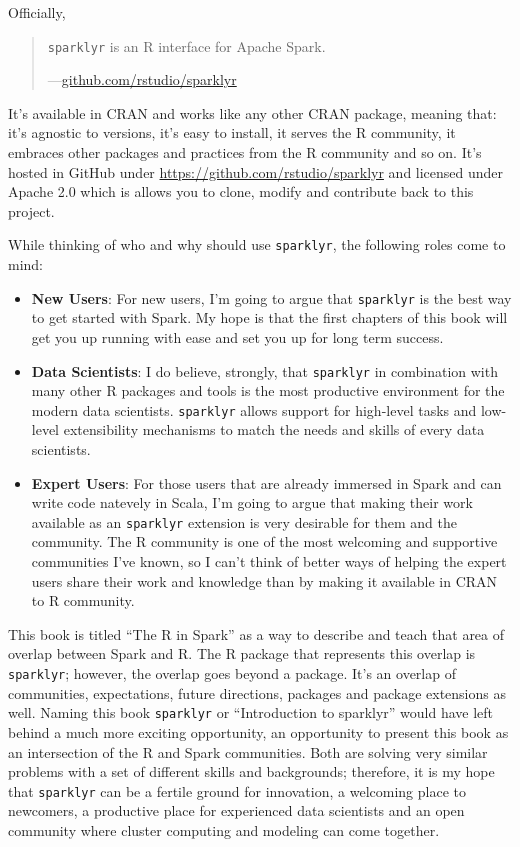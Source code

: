 \documentclass[]{book}
\providecommand{\tightlist}{%
  \setlength{\itemsep}{0pt}\setlength{\parskip}{0pt}}
\theoremstyle{definition}
\theoremstyle{definition}
\theoremstyle{definition}
\theoremstyle{remark}
\begin{document}
Officially,

\begin{quote}
\texttt{sparklyr} is an R interface for Apache Spark.

---\href{https://github.com/rstudio/sparklyr}{github.com/rstudio/sparklyr}
\end{quote}

It's available in CRAN and works like any other CRAN package, meaning
that: it's agnostic to versions, it's easy to install, it serves the R
community, it embraces other packages and practices from the R community
and so on. It's hosted in GitHub under
\href{github.com/rstudio/sparklyr}{https://github.com/rstudio/sparklyr}
and licensed under Apache 2.0 which is allows you to clone, modify and
contribute back to this project.

While thinking of who and why should use \texttt{sparklyr}, the
following roles come to mind:

\begin{itemize}
\tightlist
\item
  \textbf{New Users}: For new users, I'm going to argue that
  \texttt{sparklyr} is the best way to get started with Spark. My hope
  is that the first chapters of this book will get you up running with
  ease and set you up for long term success.
\item
  \textbf{Data Scientists}: I do believe, strongly, that
  \texttt{sparklyr} in combination with many other R packages and tools
  is the most productive environment for the modern data scientists.
  \texttt{sparklyr} allows support for high-level tasks and low-level
  extensibility mechanisms to match the needs and skills of every data
  scientists.
\item
  \textbf{Expert Users}: For those users that are already immersed in
  Spark and can write code natevely in Scala, I'm going to argue that
  making their work available as an \texttt{sparklyr} extension is very
  desirable for them and the community. The R community is one of the
  most welcoming and supportive communities I've known, so I can't think
  of better ways of helping the expert users share their work and
  knowledge than by making it available in CRAN to R community.
\end{itemize}

This book is titled ``The R in Spark'' as a way to describe and teach
that area of overlap between Spark and R. The R package that represents
this overlap is \texttt{sparklyr}; however, the overlap goes beyond a
package. It's an overlap of communities, expectations, future
directions, packages and package extensions as well. Naming this book
\texttt{sparklyr} or ``Introduction to sparklyr'' would have left behind
a much more exciting opportunity, an opportunity to present this book as
an intersection of the R and Spark communities. Both are solving very
similar problems with a set of different skills and backgrounds;
therefore, it is my hope that \texttt{sparklyr} can be a fertile ground
for innovation, a welcoming place to newcomers, a productive place for
experienced data scientists and an open community where cluster
computing and modeling can come together.
\end{document}

